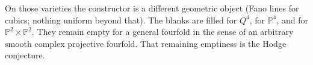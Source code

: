 \documentclass[11pt,a4paper]{article}
\newcommand{\Pspace}{\mathbb{P}}
\theoremstyle{definition}
\theoremstyle{remark}
\begin{document}
On those varieties the constructor is a different geometric object
(Fano lines for cubics; nothing uniform beyond that). The blanks are
filled for \(Q^4\), for \(\Pspace^4\), and for
\(\Pspace^2\times\Pspace^2\). They remain empty for a general fourfold
in the sense of an arbitrary smooth complex projective fourfold. That
remaining emptiness is the Hodge conjecture.
\end{document}
